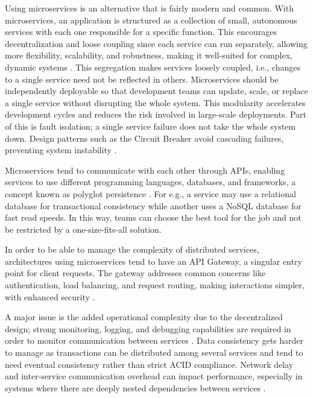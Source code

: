 \documentclass[]{final}
\begin{document}
Using microservices is an alternative that is fairly modern and common.
With microservices, an application is structured as a collection of small,
autonomous services with each one responsible for a specific function. This encourages decentralization
and loose coupling since each service can run separately, allowing more flexibility,
scalability, and robustness, making it well-suited for complex, dynamic systems \cite{robbagby_microservice_nodate}.
This segregation makes services loosely coupled, i.e., changes to a single service need not be reflected in others.
Microservices should be independently deployable so that development teams can update,
scale, or replace a single service without disrupting the whole system. This
modularity accelerates development cycles and reduces the risk involved in
large-scale deployments. Part of this is fault isolation; a
single service failure does not take the whole system down.
Design patterns such as the Circuit Breaker avoid cascading failures, preventing system instability \cite{robbagby_microservice_nodate}.

Microservices tend to communicate with each other through APIs, enabling
services to use different programming languages, databases, and frameworks,
a concept known as polyglot persistence \cite{robbagby_microservice_nodate}. For e.g., a service may use
a relational database for transactional consistency while another uses a NoSQL
database for fast read speeds. In this way,
teams can choose the best tool for the job and not be restricted by
a one-size-fits-all solution.

In order to be able to manage the complexity of distributed services, architectures using microservices
tend to have an API Gateway, a singular entry point for client requests. The gateway addresses
common concerns like authentication, load balancing, and request routing, making interactions simpler,
with enhanced security \cite{robbagby_microservice_nodate}.

\label{microservice_issue}

A major issue is the added operational complexity due to the decentralized
design; strong monitoring, logging, and debugging capabilities are required in
order to monitor communication between services \cite{robbagby_microservice_nodate}.
Data consistency gets harder to manage as transactions can be distributed among
several services and tend to need eventual consistency rather than strict ACID
compliance. Network delay and inter-service communication overhead can impact
performance, especially in systems where there are deeply nested dependencies
between services \cite{robbagby_microservice_nodate}.
\end{document}
